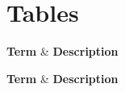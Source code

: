 \chapter{Tables}

\renewenvironment{longtable}{\oldlongtable} {\endoldlongtable}

\begin{longtable}[l]{| p{40mm} | p{105mm} |}
    \hline
        \textbf{Term} & \textbf{Description}\\
    \hline
    
    \endfirsthead
    
    \hline
        \textbf{Term} & \textbf{Description}\\
    \hline
    

\end{longtable}
